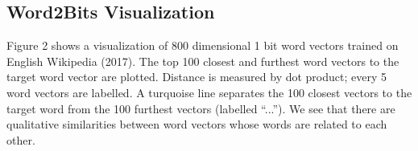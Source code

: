 \documentclass{article} %
\begin{document}
\subsection{Word2Bits Visualization}
Figure 2 shows a visualization of 800 dimensional 1 bit word vectors
trained on English Wikipedia (2017). The top 100 closest and furthest
word vectors to the target word vector are plotted. Distance is
measured by dot product; every 5 word vectors are labelled. A
turquoise line separates the 100 closest vectors to the target word
from the 100 furthest vectors (labelled ``...'').  We see that there
are qualitative similarities between word vectors whose words are
related to each other.

\begin{figure}%
    \centering
    \qquad
    \\
    \qquad

\end{figure}
\end{document}
